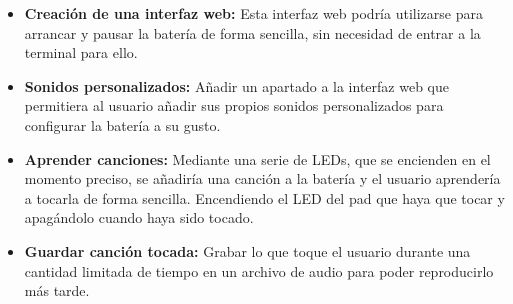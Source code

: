         \begin{itemize}
            \item \textbf{Creación de una interfaz web:} Esta interfaz web podría utilizarse para arrancar y pausar la
            batería de forma sencilla, sin necesidad de entrar a la terminal para ello.
            \item \textbf{Sonidos personalizados:} Añadir un apartado a la interfaz web que permitiera al usuario
            añadir sus propios sonidos personalizados para configurar la batería a su gusto.
            \item \textbf{Aprender canciones:} Mediante una serie de LEDs, que se encienden en el momento preciso, se
            añadiría una canción a la batería y el usuario aprendería a tocarla de forma sencilla. Encendiendo el LED
            del pad que haya que tocar y apagándolo cuando haya sido tocado.
            \item \textbf{Guardar canción tocada:} Grabar lo que toque el usuario durante una cantidad limitada de
            tiempo en un archivo de audio para poder reproducirlo más tarde.
        \end{itemize}



\newpage
